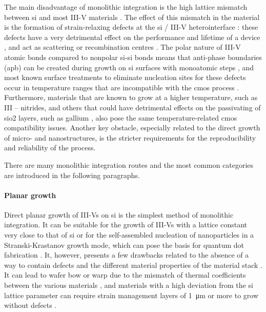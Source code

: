 The main disadvantage of monolithic integration is the high lattice mismatch between \acl{si} and most III-V materials \cite{Kuech2016}. The effect of this mismatch in the material is the formation of strain-relaxing defects at the \acl{si} / III-V heterointerface \cite{Kunert2018, Shi2021}: these defects have a very detrimental effect on the performance and lifetime of a device \cite{Mahajan2000, Zenari2021}, and act as scattering or recombination centres \cite{Jeon2015}. The polar nature of III-V atomic bonds compared to nonpolar \acs{si}-\acs{si} bonds means that anti-phase boundaries (\acs{apb}) can be created during growth on \acl{si} surfaces with monoatomic steps \cite{Kunert2018}, and most known surface treatments to eliminate nucleation sites for these defects occur in temperature ranges that are incompatible with the \acs{cmos} process \cite{Miller2000}. Furthermore, materials that are known to grow at a higher temperature, such as III – nitrides, and others that could have detrimental effects on the passivating of \acf{sio2} layers, such as gallium \cite{Miller2000}, also pose the same temperature-related \acs{cmos} compatibility issues. Another key obstacle, especially related to the direct growth of micro- and nanostructures, is the stricter requirements for the reproducibility and reliability of the process.

There are many monolithic integration routes and the most common categories are introduced in the following paragraphs.

\paragraph{Planar growth} Direct planar growth of III-Vs on \acl{si} is the simplest method of monolithic integration. It can be suitable for the growth of III-Vs with a lattice constant very close to that of \acl{si} or for the self-assembled nucleation of nanoparticles in a Stranski-Krastanov growth mode, which can pose the basis for quantum dot fabrication \cite{Shi2016, Reithmaier2016}. It, however, presents a few drawbacks related to the absence of a way to contain defects and the different material properties of the material stack \cite{Ravash2012}. It can lead to wafer bow or warp due to the mismatch of thermal coefficients between the various materials \cite{Miyoshi2016, Wang2017_2}, and materials with a high deviation from the \acl{si} lattice parameter can require strain management layers of \qty{1}{\micro\metre} or more to grow without defects \cite{Wang2017_2, Cantoro2012, Huang2022}.
\par
